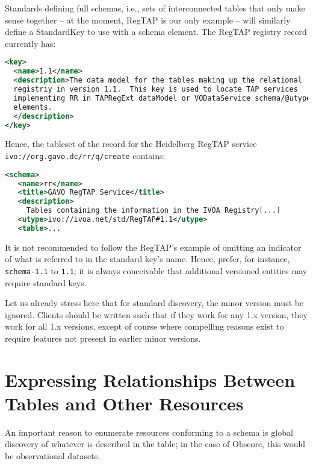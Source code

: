 \documentclass[11pt,a4paper]{ivoa}
\begin{document}
Standards defining full schemas, i.e., sets of interconnected tables
that only make sense together -- at the moment, RegTAP is our only
example -- will similarly define a StandardKey to use with a schema
element.  The RegTAP registry record currently has:

\begin{lstlisting}[language=XML]
<key>
  <name>1.1</name>
  <description>The data model for the tables making up the relational
  registriy in version 1.1.  This key is used to locate TAP services
  implementing RR in TAPRegExt dataModel or VODataService schema/@utype
  elements.
  </description>
</key>
\end{lstlisting}

Hence, the tableset of the record for the Heidelberg RegTAP service
\nolinkurl{ivo://org.gavo.dc/rr/q/create} contains:

\begin{lstlisting}[language=XML]
<schema>
   <name>rr</name>
   <title>GAVO RegTAP Service</title>
   <description>
     Tables containing the information in the IVOA Registry[...]
   <utype>ivo://ivoa.net/std/RegTAP#1.1</utype>
   <table>...
\end{lstlisting}

It is not recommended to follow the RegTAP's example of omitting an
indicator of what is referred to in the standard key's name.  Hence,
prefer, for instance, \verb|schema-1.1| to \verb|1.1|; it is always
conceivable that additional versioned entities may require standard
keys.

Let us already stress here that for standard discovery, the minor
version must be ignored.  Clients should be written such that if they
work for any 1.x version, they work for all 1.x versions, except of
course where compelling reasons exist to require features not present in
earlier minor versions.


\section{Expressing Relationships Between Tables and Other Resources}
\label{sect:rels}

An important reason to enumerate resources conforming to a schema is
global discovery of whatever is described in the table; in the case of
Obscore, this would be observational datasets.
\end{document}

